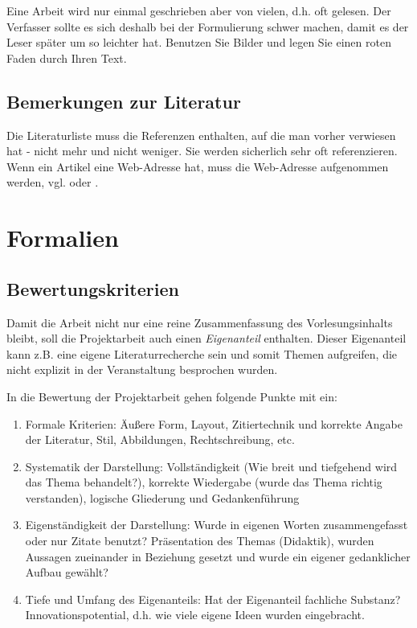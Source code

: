 \documentclass[fleqn,10pt,ngerman]{SelfArx}
\begin{document}
Eine Arbeit wird nur einmal geschrieben aber von vielen, d.h. oft gelesen. Der Verfasser sollte es sich deshalb bei der Formulierung schwer machen, damit es der Leser später um so leichter hat. Benutzen Sie Bilder und legen Sie einen roten Faden durch Ihren Text.

\subsection{Bemerkungen zur Literatur}
Die Literaturliste muss die Referenzen enthalten, auf die man vorher verwiesen hat - nicht mehr und nicht weniger. Sie werden sicherlich sehr oft referenzieren. Wenn ein Artikel eine Web-Adresse hat, muss die Web-Adresse aufgenommen werden, vgl. \cite{RobertMartinOOMetrics} oder \cite{RobertMartinSOLID}.






\section{Formalien}
\subsection{Bewertungskriterien}
Damit die Arbeit nicht nur eine reine Zusammenfassung des Vorlesungsinhalts bleibt, soll die Projektarbeit auch einen {\it Eigenanteil} enthalten. Dieser Eigenanteil kann z.B. eine eigene Literaturrecherche sein und somit Themen aufgreifen, die nicht explizit in der Veranstaltung besprochen wurden.


In die Bewertung der Projektarbeit gehen folgende Punkte mit ein:
\begin{enumerate}[noitemsep]
\item Formale Kriterien: Äußere Form, Layout, Zitiertechnik und korrekte Angabe der Literatur, Stil, Abbildungen, Rechtschreibung, etc.
\item Systematik der Darstellung: Vollständigkeit (Wie breit und tiefgehend wird das Thema behandelt?), korrekte Wiedergabe (wurde das Thema richtig verstanden), logische Gliederung und Gedankenführung
\item Eigenständigkeit der Darstellung: Wurde in eigenen Worten zusammengefasst oder nur Zitate benutzt? Präsen\-tation des Themas (Didaktik), wurden Aussagen zueinander in Beziehung gesetzt und wurde ein eigener gedanklicher Aufbau gewählt?
\item Tiefe und Umfang des Eigenanteils: Hat der Eigenanteil fachliche Substanz? Innovationspotential, d.h. wie viele eigene Ideen wurden eingebracht.
\end{enumerate}
\end{document}
